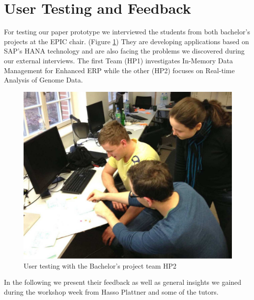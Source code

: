 
\section{User Testing and Feedback}
\label{sec:USER_TESTING}

For testing our paper prototype we interviewed the students from both bachelor's projects at the EPIC chair. (Figure  \ref{fig:user_testing}) They are developing applications based on SAP's HANA technology and are also facing the problems we discovered during our external interviews. The first Team (HP1) investigates In-Memory Data Management for Enhanced ERP while the other (HP2) focuses on Real-time Analysis of Genome Data.

\begin{figure}
\begin{centering}
    \includegraphics[width=1.0\linewidth]{images/user_testing}
    \caption{User testing with the Bachelor's project team HP2}
    \label{fig:user_testing}
\end{centering}
\end{figure}

In the following we present their feedback as well as general insights we gained during the workshop week from Hasso Plattner and some of the tutors.


